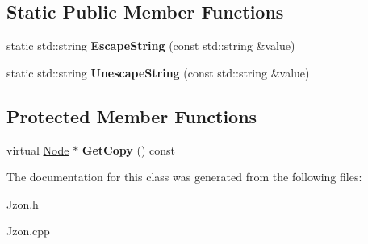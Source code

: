 \subsection*{Static Public Member Functions}
\begin{DoxyCompactItemize}
\item 
\hypertarget{class_jzon_1_1_value_a8530bdf0704914e5fd04736fcb79916a}{static std\-::string {\bfseries Escape\-String} (const std\-::string \&value)}\label{class_jzon_1_1_value_a8530bdf0704914e5fd04736fcb79916a}

\item 
\hypertarget{class_jzon_1_1_value_a5207673a51de4ebd9c9e39b1f121634b}{static std\-::string {\bfseries Unescape\-String} (const std\-::string \&value)}\label{class_jzon_1_1_value_a5207673a51de4ebd9c9e39b1f121634b}

\end{DoxyCompactItemize}
\subsection*{Protected Member Functions}
\begin{DoxyCompactItemize}
\item 
\hypertarget{class_jzon_1_1_value_af5b4f128f89c0d63fddf0bd5deb83860}{virtual \hyperlink{class_jzon_1_1_node}{Node} $\ast$ {\bfseries Get\-Copy} () const }\label{class_jzon_1_1_value_af5b4f128f89c0d63fddf0bd5deb83860}

\end{DoxyCompactItemize}


The documentation for this class was generated from the following files\-:\begin{DoxyCompactItemize}
\item 
Jzon.\-h\item 
Jzon.\-cpp\end{DoxyCompactItemize}

